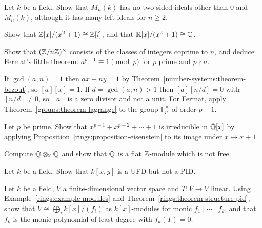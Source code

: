 \begin{exercise}\label{rings:exercise-matrix-ring-simple}
Let $k$ be a field. Show that $M_n(k)$ has no two-sided ideals other than $0$ and
$M_n(k)$, although it has many left ideals for $n \geq 2$.
\end{exercise}

\begin{exercise}\label{rings:exercise-gaussian-quotient}
Show that $\mathbb{Z}[x]/(x^2 + 1) \cong \mathbb{Z}[i]$, and that $\mathbb{R}[x]/(x^2 + 1) \cong \mathbb{C}$.
\end{exercise}

\begin{exercise}\label{rings:exercise-units-mod-n}
Show that $(\mathbb{Z}/n\mathbb{Z})^\times$ consists of the classes of integers coprime to $n$, and
deduce Fermat's little theorem: $a^{p-1} \equiv 1 \pmod p$ for $p$ prime and $p \nmid a$.
\end{exercise}

\begin{solution}
If $\gcd(a, n) = 1$ then $ax + ny = 1$ by Theorem~\ref{number-systems:theorem-bezout}, so
$[a][x] = 1$. If $d = \gcd(a, n) > 1$ then $[a][n/d] = 0$ with $[n/d] \neq 0$, so $[a]$ is a zero
divisor and not a unit. For Fermat, apply Theorem~\ref{groups:theorem-lagrange} to the group
$\mathbb{F}_p^\times$ of order $p - 1$.
\end{solution}

\begin{exercise}\label{rings:exercise-cyclotomic-irreducible}
Let $p$ be prime. Show that $x^{p-1} + x^{p-2} + \cdots + 1$ is irreducible in $\mathbb{Q}[x]$ by applying
Proposition~\ref{rings:proposition-eisenstein} to its image under $x \mapsto x + 1$.
\end{exercise}

\begin{exercise}\label{rings:exercise-rationals-tensor}
Compute $\mathbb{Q} \otimes_{\mathbb{Z}} \mathbb{Q}$ and show that $\mathbb{Q}$ is a flat $\mathbb{Z}$-module which is not free.
\end{exercise}

\begin{exercise}\label{rings:exercise-two-variables-not-pid}
Let $k$ be a field. Show that $k[x, y]$ is a UFD but not a PID.
\end{exercise}

\begin{exercise}\label{rings:exercise-jordan-preview}
Let $k$ be a field, $V$ a finite-dimensional vector space and $T \colon V \to V$ linear. Using
Example~\ref{rings:example-modules} and Theorem~\ref{rings:theorem-structure-pid}, show that
$V \cong \bigoplus_i k[x]/(f_i)$ as $k[x]$-modules for monic $f_1 \mid \cdots \mid f_k$, and that $f_k$ is
the monic polynomial of least degree with $f_k(T) = 0$.
\end{exercise}

